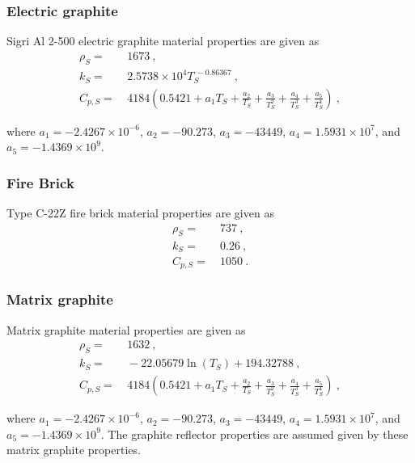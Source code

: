 \begin{appendices}
\subsubsection*{Electric graphite}
Sigri Al 2-500 electric graphite material properties are given as \cite{SANA,butland}
\begin{subequations}
\begin{align}
\rho_S=&\ 1673\ ,\\
\label{eq:k_eg}
k_S =&\ 2.5738\times10^4T_S^{\ -0.86367}\ , \\
\label{eq:Butland_cp}
C_{p,S} =&\ 4184\left(0.5421+a_1T_S+\frac{a_2}{T_S}+\frac{a_3}{T_S^2}+\frac{a_4}{T_S^3}+\frac{a_5}{T_S^4}\right)\ ,
\end{align}
\end{subequations}

\noindent where \(a_1=-2.4267\times10^{-6}\), \(a_2=-90.273\), \(a_3=-43449\), \(a_4=1.5931\times10^7\), and \(a_5=-1.4369\times10^9\).

\subsubsection*{Fire Brick}
Type C-22Z fire brick material properties are given as \cite{firebrick,firebrick2}
\begin{subequations}
\begin{align}
\rho_S=&\ 737\ ,\\
\label{eq:k_mg}
k_S=&\ 0.26\ , \\
\label{eq:Butland_cp2}
C_{p,S} =&\ 1050\ .
\end{align}
\end{subequations}

\subsubsection*{Matrix graphite}
Matrix graphite material properties are given as \cite{SANA,butland}
\begin{subequations}
\begin{align}
\rho_S=&\ 1632\ ,\\
\label{eq:k_mg}
k_S=&\ -22.05679\ln{(T_S)}+194.32788\ , \\
\label{eq:Butland_cp2}
C_{p,S} =&\ 4184\left(0.5421+a_1T_S+\frac{a_2}{T_S}+\frac{a_3}{T_S^2}+\frac{a_4}{T_S^3}+\frac{a_5}{T_S^4}\right)\ ,
\end{align}
\end{subequations}

\noindent where \(a_1=-2.4267\times10^{-6}\), \(a_2=-90.273\), \(a_3=-43449\), \(a_4=1.5931\times10^7\), and \(a_5=-1.4369\times10^9\). The graphite reflector properties are assumed given by these matrix graphite properties.


\end{appendices}
